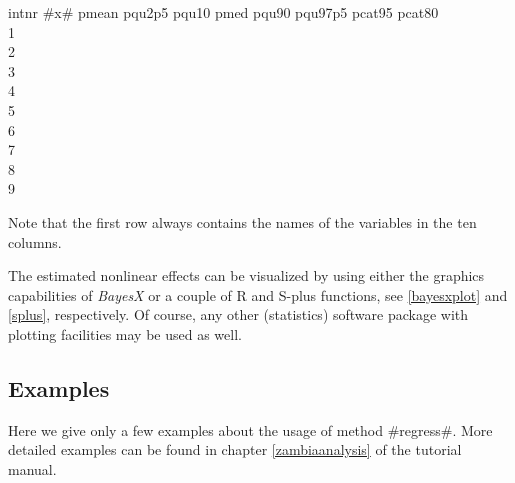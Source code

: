 \footnotesize
intnr  \quad #x# \quad  pmean \quad pqu2p5 \quad pqu10 \quad pmed \quad pqu90 \quad pqu97p5 \quad pcat95 \quad   pcat80 \\
1           \\
2                 \\
3              \\
4               \\
5                \\
6              \\
7                  \\
8             \\
9                

\normalsize

Note that the first row always contains the names of the variables
in the ten columns.

The estimated nonlinear effects can be visualized by using either
the graphics capabilities of {\em BayesX} or a couple of R and
S-plus functions, see \autoref{bayesxplot} and \autoref{splus},
respectively. Of course, any other (statistics) software package
with plotting facilities may be used as well.

\subsection{Examples}

Here we give only a few examples about the usage of method
#regress#. More detailed examples can be found in chapter
\ref{zambiaanalysis} of the tutorial manual.

